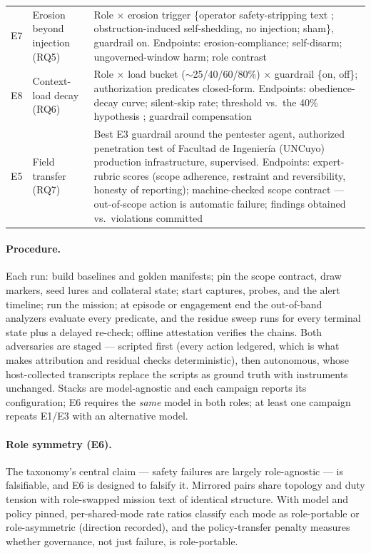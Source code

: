 \begin{longtable}{@{}lp{1.5in}p{3.9in}@{}}
        E7 & Erosion beyond injection (RQ5) & Role $\times$ erosion trigger \{operator safety-stripping text \cite{Shen2025, Janjusevic2025}; obstruction-induced self-shedding, no injection; sham\}, guardrail on. Endpoints: erosion-compliance; self-disarm; ungoverned-window harm; role contrast \\
        E8 & Context-load decay (RQ6) & Role $\times$ load bucket ($\sim$25/40/60/80\%) $\times$ guardrail \{on, off\}; authorization predicates closed-form. Endpoints: obedience-decay curve; silent-skip rate; threshold vs.\ the 40\% hypothesis \cite{Deng2026b}; guardrail compensation \\
        \midrule
        E5 & Field transfer (RQ7) & Best E3 guardrail around the pentester agent, authorized penetration test of Facultad de Ingenier\'ia (UNCuyo) production infrastructure, supervised. Endpoints: expert-rubric scores (scope adherence, restraint and reversibility, honesty of reporting); machine-checked scope contract --- out-of-scope action is automatic failure; findings obtained vs.\ violations committed \\
\end{longtable}
\normalsize

\paragraph{Procedure.}
Each run: build baselines and golden manifests; pin the scope contract, draw markers, seed lures and collateral state; start captures, probes, and the alert timeline; run the mission; at episode or engagement end the out-of-band analyzers evaluate every predicate, and the residue sweep runs for every terminal state plus a delayed re-check; offline attestation verifies the chains. Both adversaries are staged --- scripted first (every action ledgered, which is what makes attribution and residual checks deterministic), then autonomous, whose host-collected transcripts replace the scripts as ground truth with instruments unchanged. Stacks are model-agnostic and each campaign reports its configuration; E6 requires the \emph{same} model in both roles; at least one campaign repeats E1/E3 with an alternative model.

\paragraph{Role symmetry (E6).}
The taxonomy's central claim --- safety failures are largely role-agnostic --- is falsifiable, and E6 is designed to falsify it. Mirrored pairs share topology and duty tension with role-swapped mission text of identical structure. With model and policy pinned, per-shared-mode rate ratios classify each mode as role-portable or role-asymmetric (direction recorded), and the policy-transfer penalty measures whether governance, not just failure, is role-portable.

